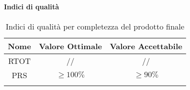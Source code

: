 		\paragraph{Indici di qualità}
			\begin{center}
				\begin{longtable}{|c|c|c|}
				\hline
				\rowcolor{lighter-grayer}
				\textbf{Nome} & \textbf{Valore Ottimale} & \textbf{Valore Accettabile}\\
				\hline
				\endfirsthead
				\hline
				RTOT & // &// \\
				\hline
				PRS & $\geq100\%$ & $\geq 90\%$ \\
				\hline
				\rowcolor{white}
				\caption{Indici di qualità per completezza del prodotto finale}
				\end{longtable}
			\end{center}
				
				
	
	
	
	
	
	
	
	
	
	
	
	
	
	
	
	